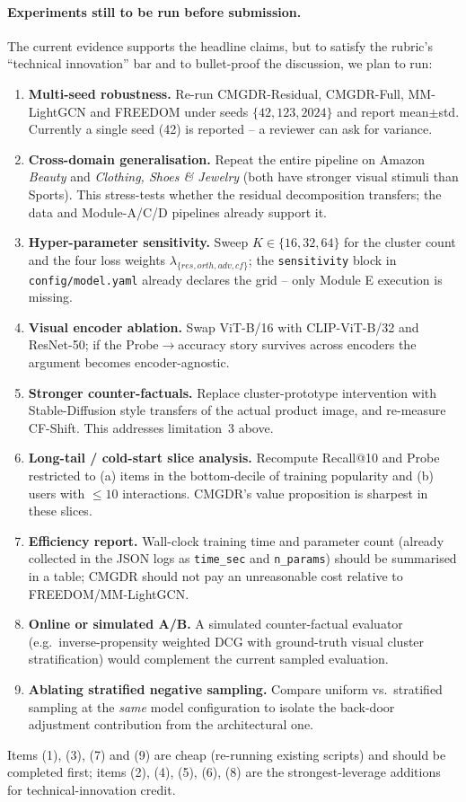 \documentclass[12pt,a4paper]{article}
\begin{document}
\paragraph{Experiments still to be run before submission.}
The current evidence supports the headline claims, but to satisfy the rubric's
``technical innovation'' bar and to bullet-proof the discussion, we plan to run:
\begin{enumerate}[label=(\arabic*)]
\item \textbf{Multi-seed robustness.} Re-run CMGDR-Residual, CMGDR-Full, MM-LightGCN
      and FREEDOM under seeds $\{42,123,2024\}$ and report mean$\pm$std. Currently a
      single seed (42) is reported -- a reviewer can ask for variance.
\item \textbf{Cross-domain generalisation.} Repeat the entire pipeline on Amazon
      \emph{Beauty} and \emph{Clothing, Shoes \& Jewelry} (both have stronger visual
      stimuli than Sports). This stress-tests whether the residual decomposition
      transfers; the data and Module-A/C/D pipelines already support it.
\item \textbf{Hyper-parameter sensitivity.} Sweep $K\!\in\!\{16,32,64\}$ for the
      cluster count and the four loss weights $\lambda_{\{res,orth,adv,cf\}}$; the
      \texttt{sensitivity} block in \texttt{config/model.yaml} already declares the
      grid -- only Module E execution is missing.
\item \textbf{Visual encoder ablation.} Swap ViT-B/16 with CLIP-ViT-B/32 and
      ResNet-50; if the Probe$\to$accuracy story survives across encoders the
      argument becomes encoder-agnostic.
\item \textbf{Stronger counter-factuals.} Replace cluster-prototype intervention with
      Stable-Diffusion style transfers of the actual product image, and re-measure
      CF-Shift. This addresses limitation~3 above.
\item \textbf{Long-tail / cold-start slice analysis.} Recompute Recall@10 and Probe
      restricted to (a) items in the bottom-decile of training popularity and
      (b) users with $\leq 10$ interactions. CMGDR's value proposition is sharpest in
      these slices.
\item \textbf{Efficiency report.} Wall-clock training time and parameter count
      (already collected in the JSON logs as \texttt{time\_sec} and \texttt{n\_params})
      should be summarised in a table; CMGDR should not pay an unreasonable cost
      relative to FREEDOM/MM-LightGCN.
\item \textbf{Online or simulated A/B.} A simulated counter-factual evaluator
      (e.g.\ inverse-propensity weighted DCG with ground-truth visual cluster
      stratification) would complement the current sampled evaluation.
\item \textbf{Ablating stratified negative sampling.} Compare uniform vs.\ stratified
      sampling at the \emph{same} model configuration to isolate the back-door
      adjustment contribution from the architectural one.
\end{enumerate}
Items (1), (3), (7) and (9) are cheap (re-running existing scripts) and should be
completed first; items (2), (4), (5), (6), (8) are the strongest-leverage additions
for technical-innovation credit.
\end{document}
